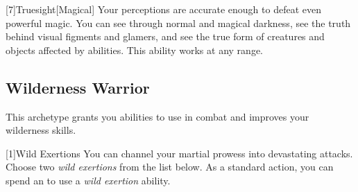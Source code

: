         [7]{Truesight}[Magical]
        Your perceptions are accurate enough to defeat even powerful magic.
        You can see through normal and magical darkness, see the truth behind visual figments and glamers, and see the true form of creatures and objects affected by  abilities.
        This ability works at any range.

    \subsection{Wilderness Warrior}
        This archetype grants you abilities to use in combat and improves your wilderness skills.

        [1]{Wild Exertions} 
        You can channel your martial prowess into devastating attacks.
        Choose two \textit{wild exertions} from the list below.
        As a standard action, you can spend an  to use a \textit{wild exertion} ability.
